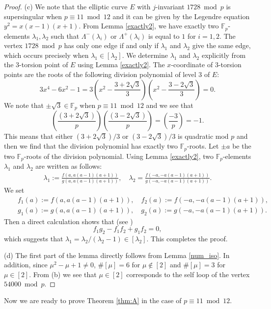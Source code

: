 \documentclass[a4paper, 11pt]{article}
\theoremstyle{plain}
\newcommand{\?}{\textcolor{red}{??}}
\newcommand{\lm}{\lambda}
\newcommand{\Lm}{\Lambda}
\newcommand{\fp}{\mathbb{F}_p}
\begin{document}
\begin{proof}
(c)
We note that the elliptic curve $E$ with $j$-invariant $1728 \bmod p$ is supersingular when $p\equiv 11 \bmod 12$ and it can be given by the Legendre equation $y^2=x(x-1)(x+1)$. From Lemma \ref{exactly2}, we have exactly two $\fp$-elements $\lm_1,\lm_2$ such that $\Lm^{-}(\lm_i)$ or $\Lm^{+}(\lm_i)$ is equal to $1$ for $i=1,2$. The vertex $1728 \bmod p$ has only one edge if and only if $\lm_1$ and $\lm_2$ give the same edge, which occurs precisely when $\lm_1\in[\lm_2]$. We determine $\lm_1$ and $\lm_2$ explicitly from the $3$-torsion point of $E$ using Lemma \ref{exactly2}. The $x$-coordinate of $3$-torsion points are the roots of the following division polynomial of level $3$ of $E$:
\[
3x^4-6x^2-1=3\left(x^2-\frac{3+2\sqrt{3}}{3}\right)\left(x^2-\frac{3-2\sqrt{3}}{3}\right)=0.
\]
We note that $\pm\sqrt{3} \in \fp$ when $p \equiv11 \bmod 12$ and we see that
\[
\left( \frac{(3+2\sqrt{3})}{p} \right)\left( \frac{(3-2\sqrt{3})}{p} \right)=\left( \frac{-3}{p} \right)=-1.
\]
This means that either
$(3+2\sqrt{3})/3$ or $(3-2\sqrt{3})/3$ is quadratic mod $p$ and then we find that the division polynomial has exactly two $\fp$-roots. Let $\pm a$ be the two $\fp$-roots of the division polynomial. Using Lemma \ref{exactly2}, two $\fp$-elements $\lm_1$ and $\lm_2$ are written as follows:
\begin{align*}
    \lm_1:=\frac{f(a,a(a-1)(a+1))}{g(a,a(a-1)(a+1))}, \quad \lm_2=\frac{f(-a,-a(a-1)(a+1))}{g(-a,-a(a-1)(a+1))}.
\end{align*}
We set
\begin{align*}
   && f_1(a):=f(a,a(a-1)(a+1)), \quad f_2(a):=f(-a,-a(a-1)(a+1)),\\
   && g_1(a):=g(a,a(a-1)(a+1)), \quad g_2(a):=g(-a,-a(a-1)(a+1)) .
\end{align*}
Then a direct calculation shows that (see \cite[17]{Github})
\[
f_1g_2-f_1f_2+g_1f_2=0,
\]
which suggests that $\lm_1=\lm_2/(\lm_2-1)\in[\lm_2]$. This completes the proof.


(d) The first part of the lemma directly follows from Lemma \ref{num_iso}. In addition, since $\mu^2-\mu+1\ne 0$, $\#[\mu]=6$ for $\mu \notin [2]$ and $\#[\mu]=3$ for $\mu \in [2]$. From (b) we see that $\mu\in [2]$ corresponds to the self loop of the vertex $54000 \bmod p$. 
\end{proof} 
Now we are ready to prove Theorem \ref{thm:A} in the case of $p \equiv11 \bmod12$.
\end{document}
